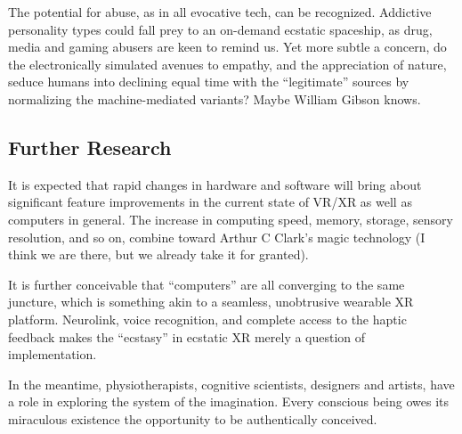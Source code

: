 \documentclass{UIdahoMastersThesis}
\begin{document}
The potential for abuse, as in all evocative tech, can be recognized. Addictive personality types could fall prey to an on-demand ecstatic spaceship, as drug, media and gaming abusers are keen to remind us. Yet more subtle a concern, do the electronically simulated avenues to empathy, and the appreciation of nature, seduce humans into declining equal time with the ``legitimate'' sources by normalizing the machine-mediated variants? Maybe William Gibson knows.

\subsection{Further Research}
It is expected that rapid changes in hardware and software will bring about significant feature improvements in the current state of VR/XR as well as computers in general. The increase in computing speed, memory, storage, sensory resolution, and so on, combine toward Arthur C Clark's magic technology (I think we are there, but we already take it for granted).

It is further conceivable that ``computers'' are all converging to the same juncture, which is something akin to a seamless, unobtrusive wearable XR platform. Neurolink, voice recognition, and complete access to the haptic feedback makes the ``ecstasy'' in ecstatic XR merely a question of implementation.

In the meantime, physiotherapists, cognitive scientists, designers and artists, have a role in exploring the system of the imagination.
Every conscious being owes its miraculous existence the opportunity to be authentically conceived.



\clearpage
\renewcommand\bibname{References} %
\addcontentsline{toc}{chapter}{\textsc{\bibname}} %

\end{document}
